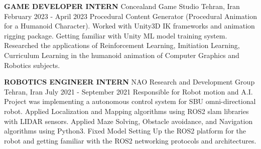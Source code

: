 \begin{cventries}
		
    \cventry
    {\textbf{GAME DEVELOPER INTERN}}
    {Concealand Game Studio}
    {Tehran, Iran}
    {February 2023 - April 2023}
    {Procedural Content Generator (Procedural Animation for a Humanoid Character). \newline Worked with Unity3D IK frameworks and animation rigging package. \newline Getting familiar with Unity ML model training system. \newline Researched the applications of Reinforcement Learning, Imitiation Learning, Curriculum Learning in the humanoid animation of Computer Graphics and Robotics subjects.}   
    
\vspace{0.7 cm}

    \cventry
    {\textbf{ROBOTICS ENGINEER INTERN}}
    {NAO Research and Development Group}
    {Tehran, Iran}
    {July 2021 - September 2021}
    {Responsible for Robot motion and A.I. \newline Project was implementing a autonomous control system for SBU omni-directional robot. Applied Localization and Mapping algorithms using ROS2 slam libraries with LIDAR sensors. \newline Applied Maze Solving, Obstacle avoidance, and Navigation algorithms using Python3. \newline Fixed Model \newline Setting Up the ROS2 platform for the robot and getting familiar with the ROS2 networking protocols and architectures.}   
    
\end{cventries}

